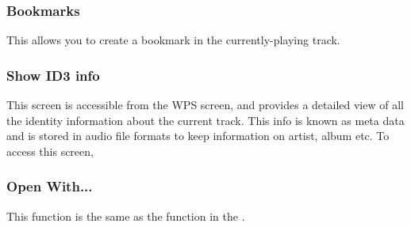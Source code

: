 \subsubsection{Bookmarks}
This allows you to create a bookmark in the currently-playing track.

\subsubsection{\label{ref:ID3viewer}Show ID3 info}
This screen is accessible from the WPS screen, and provides a detailed view of
all the identity information about the current track. This info is known as
meta data and is stored in audio file formats to keep information on artist,
album etc. To access this screen, %
%
%
%
\subsubsection{Open With...}
This  function is the same as the  
function in the \setting{File Context Menu}.

